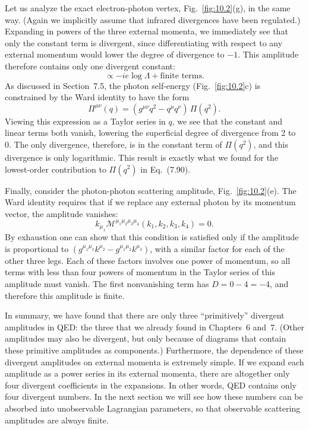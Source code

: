 Let us analyze the exact electron-photon vertex, Fig.~\ref{fig:10.2}(g), in
the same way.  (Again we implicitly assume that infrared divergences have been
regulated.)  Expanding in powers of the three external momenta, we immediately
see that only the constant term is divergent, since differentiating with
respect to any external momentum would lower the degree of divergence to
$-1$.  This amplitude therefore contains only one divergent constant:
\begin{equation}
  \propto -ie\log\Lambda + \text{finite terms} .
  \label{eq:10.7}
\end{equation}
As discussed in Section~7.5, the photon self-energy (Fig.~\ref{fig:10.2}c) is
constrained by the Ward identity to have the form
\begin{equation}
  \Pi^{\mu\nu}(q) = (g^{\mu\nu}q^2 - q^\mu q^\nu)\,\Pi(q^2) .
  \label{eq:10.8}
\end{equation}
Viewing this expression as a Taylor series in $q$, we see that the constant and
linear terms both vanish, lowering the superficial degree of divergence from 2
to 0.  The only divergence, therefore, is in the constant term of
$\Pi(q^2)$, and this divergence is only logarithmic.  This result is exactly
what we found for the lowest-order contribution to $\Pi(q^2)$ in
Eq.~(7.90).

Finally, consider the photon-photon scattering amplitude,
Fig.~\ref{fig:10.2}(e).  The Ward identity requires that if we replace any
external photon by its momentum vector, the amplitude vanishes:
\begin{equation}
  k_{\mu_1}\mathcal{M}^{\mu_1\mu_2\mu_3\mu_4}(k_1,k_2,k_3,k_4) = 0 .
  \label{eq:10.9}
\end{equation}
By exhaustion one can show that this condition is satisfied only if the
amplitude is proportional to $(g^{\mu_1\mu_3}k^{\mu_2} - g^{\mu_1\mu_2}k^{\mu_3})$,
with a similar factor for each of the other three legs.  Each of these factors
involves one power of momentum, so all terms with less than four powers of
momentum in the Taylor series of this amplitude must vanish.  The first
nonvanishing term has $D = 0 - 4 = -4$, and therefore this amplitude is
finite.

In summary, we have found that there are only three ``primitively'' divergent
amplitudes in QED: the three that we already found in Chapters~6 and~7.
(Other amplitudes may also be divergent, but only because of diagrams that
contain these primitive amplitudes as components.)  Furthermore, the
dependence of these divergent amplitudes on external momenta is extremely
simple.  If we expand each amplitude as a power series in its external
momenta, there are altogether only four divergent coefficients in the
expansions.  In other words, QED contains only four divergent numbers.  In
the next section we will see how these numbers can be absorbed into
unobservable Lagrangian parameters, so that observable scattering amplitudes
are always finite.

